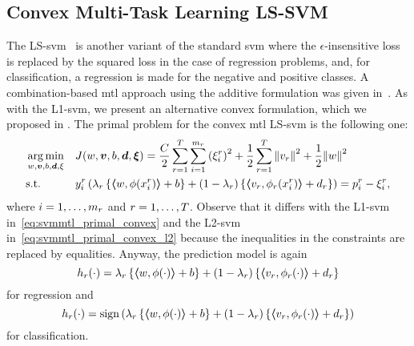 \subsection{Convex Multi-Task Learning LS-SVM}
The LS-\acrshort{svm}~\citep{SuykensV99} is another variant of the standard \acrshort{svm} where the $\epsilon$-insensitive loss is replaced by the squared loss in the case of regression problems, and, for classification, a regression is made for the  negative and positive classes.
A combination-based \acrshort{mtl} approach using the additive formulation was given in~\cite{XuAQZ14}.
As with the L1-\acrshort{svm}, we present an alternative convex formulation, which we proposed in \cite{RuizAD21}.
The primal problem for the convex \acrshort{mtl} LS-\acrshort{svm} is the following one:
\begin{equation}\label{eq:svmmtl_primal_convex_ls}
    \begin{aligned}
    & \argmin_{w, \fv{v}, b, \fv{d}, \xi}
    & & {J({w}, \fv{v}, b, \fv{d}, \fv{\xi}) = \frac{C}{2} \sum_{r= 1}^T \sum_{i=1}^{m_r} \left({\xi_{i}^r}\right)^2 + \frac{1}{2} \sum_{r= 1}^T{\norm{{v}_r}^2} + \frac{1}{2} {\norm{{w}}}^2} \\
    & \text{s.t.}
    & & y_{i}^r \left(\lambda_r \left\lbrace \dotp{w}{\phi(x_{i}^r)} + b  \right\rbrace + (1 - \lambda_r) \left\lbrace \dotp{{v}_r}{\phi_r(x_{i}^r)} + d_r \right\rbrace  \right) = p_{i}^r - \xi_{i}^r ,  \\
    \end{aligned}
\end{equation}
where $i=1, \ldots, m_r$ and $r=1, \ldots, T$.
Observe that it differs with the L1-\acrshort{svm} in~\eqref{eq:svmmtl_primal_convex} and the L2-\acrshort{svm} in~\eqref{eq:svmmtl_primal_convex_l2} because the inequalities in the constraints are replaced by equalities.
Anyway, the prediction model is again
\begin{equation}
    \nonumber
    h_r(\cdot) = \lambda_r \left\lbrace \bm{\left\langle} w, \phi(\cdot) \bm{\right\rangle} + b  \right\rbrace + (1 - \lambda_r) \left\lbrace \bm{\left\langle} {v}_r, \phi_r(\cdot) \bm{\right\rangle} + d_r \right\rbrace
\end{equation}
for regression and 
\begin{equation}
    \nonumber
    h_r(\cdot) = \operatorname{sign}{ \left(\lambda_r \left\lbrace \bm{\left\langle} w, \phi(\cdot) \bm{\right\rangle} + b  \right\rbrace + (1 - \lambda_r) \left\lbrace \bm{\left\langle} {v}_r, \phi_r(\cdot) \bm{\right\rangle} + d_r \right\rbrace \right)}
\end{equation}
for classification.
%

